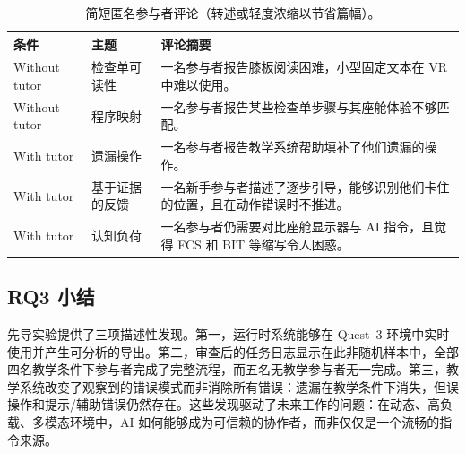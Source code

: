 \begin{table}[htbp]
\centering
\caption{简短匿名参与者评论（转述或轻度浓缩以节省篇幅）。}
\label{tab:pilot-comments}
\small
\begin{tabularx}{\textwidth}{@{}llX@{}}
\toprule
\textbf{条件} & \textbf{主题} & \textbf{评论摘要} \\
\midrule
Without tutor & 检查单可读性 & 一名参与者报告膝板阅读困难，小型固定文本在 VR 中难以使用。 \\
Without tutor & 程序映射 & 一名参与者报告某些检查单步骤与其座舱体验不够匹配。 \\
With tutor & 遗漏操作 & 一名参与者报告教学系统帮助填补了他们遗漏的操作。 \\
With tutor & 基于证据的反馈 & 一名新手参与者描述了逐步引导，能够识别他们卡住的位置，且在动作错误时不推进。 \\
With tutor & 认知负荷 & 一名参与者仍需要对比座舱显示器与 AI 指令，且觉得 FCS 和 BIT 等缩写令人困惑。 \\
\bottomrule
\end{tabularx}
\end{table}

\subsection{RQ3 小结}

先导实验提供了三项描述性发现。第一，运行时系统能够在 Quest~3 环境中实时使用并产生可分析的导出。第二，审查后的任务日志显示在此非随机样本中，全部四名教学条件下参与者完成了完整流程，而五名无教学参与者无一完成。第三，教学系统改变了观察到的错误模式而非消除所有错误：遗漏在教学条件下消失，但误操作和提示/辅助错误仍然存在。这些发现驱动了未来工作的问题：在动态、高负载、多模态环境中，AI 如何能够成为可信赖的协作者，而非仅仅是一个流畅的指令来源。
